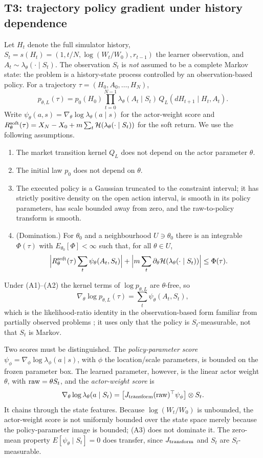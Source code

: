 \documentclass[11pt]{article}
\begin{document}
\subsection*{T3: trajectory policy gradient under history dependence}
Let $H_t$ denote the full simulator history, $S_t=s(H_t)=(1,t/N,\log(W_t/W_0),r_{t-1})$ the learner observation, and $A_t\sim\lambda_\theta(\cdot\mid S_t)$. The observation $S_t$ is \emph{not} assumed to be a complete Markov state: the problem is a history-state process controlled by an observation-based policy. For a trajectory $\tau=(H_0,A_0,\dots,H_N)$,
\[
p_{\theta,L}(\tau)=p_0(H_0)\prod_{t=0}^{N-1}\lambda_\theta(A_t\mid S_t)\,Q_L(dH_{t+1}\mid H_t,A_t).
\]
Write $\psi_\theta(a,s)=\nabla_\theta\log\lambda_\theta(a\mid s)$ for the actor-weight score and $R^{\rm soft}_\theta(\tau)=X_N-X_0+m\sum_t\mathcal H(\lambda_\theta(\cdot\mid S_t))$ for the soft return. We use the following assumptions.
\begin{enumerate}[label=(A\arabic*),leftmargin=3em]
\item The market transition kernel $Q_L$ does not depend on the actor parameter $\theta$.
\item The initial law $p_0$ does not depend on $\theta$.
\item The executed policy is a Gaussian truncated to the constraint interval; it has strictly positive density on the open action interval, is smooth in its policy parameters, has scale bounded away from zero, and the raw-to-policy transform is smooth.
\item (Domination.) For $\theta_0$ and a neighbourhood $U\ni\theta_0$ there is an integrable $\Phi(\tau)$ with $E_{\theta_0}[\Phi]<\infty$ such that, for all $\theta\in U$,
\[
\Big|R^{\rm soft}_\theta(\tau)\sum_t\psi_\theta(A_t,S_t)\Big|+\Big|m\sum_t\partial_\theta \mathcal H(\lambda_\theta(\cdot\mid S_t))\Big|\le\Phi(\tau).
\]
\end{enumerate}
Under (A1)--(A2) the kernel terms of $\log p_{\theta,L}$ are $\theta$-free, so
\[
\nabla_\theta\log p_{\theta,L}(\tau)=\sum_t\psi_\theta(A_t,S_t),
\]
which is the likelihood-ratio identity \cite{Williams1992} in the observation-based form familiar from partially observed problems \cite{BaxterBartlett2001}; it uses only that the policy is $S_t$-measurable, not that $S_t$ is Markov.

Two scores must be distinguished. The \emph{policy-parameter score} $\psi_\phi=\nabla_\phi\log\lambda_\phi(a\mid s)$, with $\phi$ the location/scale parameters, is bounded on the frozen parameter box. The learned parameter, however, is the linear actor weight $\theta$, with ${\rm raw}=\theta S_t$, and the \emph{actor-weight score} is
\[
\nabla_\theta\log\lambda_\theta(a\mid S_t)=\big[J_{\rm transform}({\rm raw})^{\top}\psi_\phi\big]\otimes S_t .
\]
It chains through the state features. Because $\log(W_t/W_0)$ is unbounded, the actor-weight score is not uniformly bounded over the state space merely because the policy-parameter image is bounded; (A3) does not dominate it. The zero-mean property $E[\psi_\theta\mid S_t]=0$ does transfer, since $J_{\rm transform}$ and $S_t$ are $S_t$-measurable.
\end{document}
